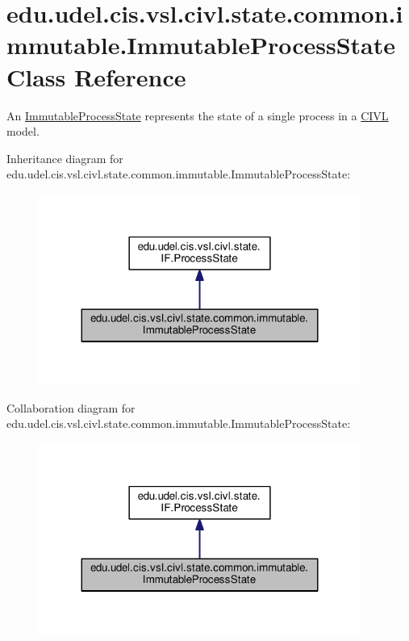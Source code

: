 \hypertarget{classedu_1_1udel_1_1cis_1_1vsl_1_1civl_1_1state_1_1common_1_1immutable_1_1ImmutableProcessState}{}\section{edu.\+udel.\+cis.\+vsl.\+civl.\+state.\+common.\+immutable.\+Immutable\+Process\+State Class Reference}
\label{classedu_1_1udel_1_1cis_1_1vsl_1_1civl_1_1state_1_1common_1_1immutable_1_1ImmutableProcessState}


An \hyperlink{classedu_1_1udel_1_1cis_1_1vsl_1_1civl_1_1state_1_1common_1_1immutable_1_1ImmutableProcessState}{Immutable\+Process\+State} represents the state of a single process in a \hyperlink{classedu_1_1udel_1_1cis_1_1vsl_1_1civl_1_1CIVL}{C\+I\+V\+L} model.  




Inheritance diagram for edu.\+udel.\+cis.\+vsl.\+civl.\+state.\+common.\+immutable.\+Immutable\+Process\+State\+:
\nopagebreak
\begin{figure}[H]
\begin{center}
\leavevmode
\includegraphics[width=299pt]{classedu_1_1udel_1_1cis_1_1vsl_1_1civl_1_1state_1_1common_1_1immutable_1_1ImmutableProcessState__inherit__graph}
\end{center}
\end{figure}


Collaboration diagram for edu.\+udel.\+cis.\+vsl.\+civl.\+state.\+common.\+immutable.\+Immutable\+Process\+State\+:
\nopagebreak
\begin{figure}[H]
\begin{center}
\leavevmode
\includegraphics[width=299pt]{classedu_1_1udel_1_1cis_1_1vsl_1_1civl_1_1state_1_1common_1_1immutable_1_1ImmutableProcessState__coll__graph}
\end{center}
\end{figure}
